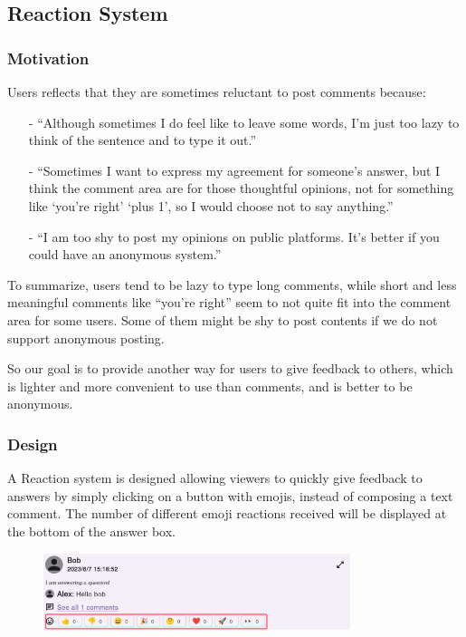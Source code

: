 \documentclass[a4paper]{article}
\begin{document}
    \subsection*{Reaction System}
    \subsubsection*{Motivation}
    \noindent Users reflects that they are sometimes reluctant to post comments because:
    \begin{itemize}
        \item[-] ``Although sometimes I do feel like to leave some words, I'm just too lazy to think of the sentence and to type it out.''
        \item[-] ``Sometimes I want to express my agreement for someone's answer, but I think the comment area are for those thoughtful opinions,
        not for something like `you're right' `plus 1', so I would choose not to say anything.''
        \item[-] ``I am too shy to post my opinions on public platforms.
        It's better if you could have an anonymous system.''
    \end{itemize}

    To summarize, users tend to be lazy to type long comments, while short and less meaningful comments like ``you're right''
    seem to not quite fit into the comment area for some users.
    Some of them might be shy to post contents if we do not support anonymous posting.

    So our goal is to provide another way for users to give feedback to others, which is lighter and more convenient to use than comments,
    and is better to be anonymous.

    \subsubsection*{Design}
    A Reaction system is designed allowing viewers to quickly give feedback to answers by simply clicking on a button with emojis, instead of composing a text comment.
    The number of different emoji reactions received will be displayed at the bottom of the answer box.

    \begin{figure}[H]
        \centering
        \includegraphics[width=0.8\textwidth]{reaction}
    \end{figure}
\end{document}
